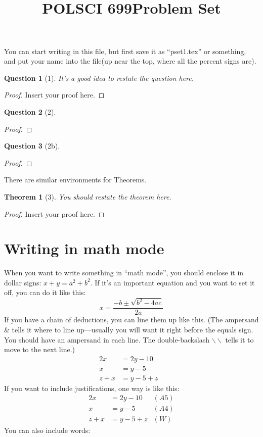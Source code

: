 \documentclass[11pt]{article}
\title{\vspace{-50pt}
\Huge \name
\\\vspace{20pt}
\huge POLSCI 699\hfill Problem Set \hw}
\author{}
\date{}
\theoremstyle{quest}
\newtheorem*{theorem}{Theorem}
\newtheorem*{question}{Question}
\begin{document}
\maketitle

You can start writing in this file, but first save it as ``pset1.tex'' or something, and put your name into the file(up near the top, where all the percent signs are). 

\begin{question}[1]
  It's a good idea to restate the question here.
\end{question}
\begin{proof}
  Insert your proof here.
\end{proof}

\begin{question}[2]

\end{question}
\begin{proof}

\end{proof}

\begin{question}[2b]

\end{question}
\begin{proof}

\end{proof}

There are similar environments for Theorems.

\begin{theorem}[3]
  You should restate the theorem here.
\end{theorem}
\begin{proof}
  Insert your proof here.
\end{proof}


\section*{Writing in math mode}
When you want to write something in ``math mode'', you should enclose it in dollar signs: $x+y=a^2+b^2$.
If it's an important equation and you want to set it off, you can do it like this: \[x = \frac{-b \pm \sqrt{b^2-4ac} }{2a}\]
If you have a chain of deductions, you can line them up like this. (The ampersand \& tells it where to line up---usually you will want it right before the equals sign. You should have an ampersand in each line. The double-backslash $\backslash\backslash$ tells it to move to the next line.)
\begin{align*}
  2x &= 2y-10&\\
  x &=y-5 &\\
  z+x &= y-5+z
\end{align*}
If you want to include justifications, one way is like this:
\begin{align*}
  2x &= 2y-10 & (A5)\\
  x &=y-5  & (A4)\\
  z+x &= y-5+z & (W)
\end{align*}
You can also include words:
\end{document}
